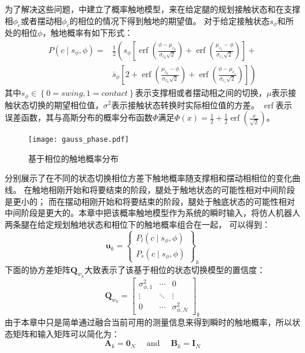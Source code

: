 为了解决这些问题，中建立了概率触地模型，来在给定腿的规划接触状态和在支撑相$\phi_c$或者摆动相$\phi_{\bar c}$的相位的情况下得到触地的期望值。
对于给定接触状态$s_{\phi}$和所处的相位$\phi$，触地概率有如下形式：
\begin{equation}
    \label{equ:est_contact_prob}
    \begin{aligned}
        P\left(c \mid s_\phi, \phi\right)= & \frac{1}{2}\left(s_\phi\left[\operatorname{erf}\left(\frac{\phi-\mu_{c_0}}{\sigma_{c_0} \sqrt{2}}\right)+\operatorname{erf}\left(\frac{\mu_{c_1}-\phi}{\sigma_{c_1} \sqrt{2}}\right)\right]+\right. \\
        & \left.\bar{s}_\phi\left[2+\operatorname{erf}\left(\frac{\mu_{\bar{c}_0}-\phi}{\sigma_{\bar{c}_0} \sqrt{2}}\right)+\operatorname{erf}\left(\frac{\phi-\mu_{\bar{c}_1}}{\sigma_{\bar{c}_1} \sqrt{2}}\right)\right]\right)
        \end{aligned}
\end{equation}
其中$s_{\phi} \in \left\{0=swing, 1=contact\right\}$表示支撑相或者摆动相之间的切换，$\mu$表示接触状态切换的期望相位值，$\sigma^2$表示接触状态转换时实际相位值的方差。
$\operatorname{erf}$表示误差函数，其与高斯分布的概率分布函数$\Phi$满足$\Phi(x)=\frac{1}{2}+\frac{1}{2} \operatorname{erf}\left(\frac{x}{\sqrt{2}}\right)$。
\begin{figure}[htbp]
    \centering
    \texttt{[image: gauss\_phase.pdf]}
    \caption{\label{fig:gauss_phase}基于相位的触地概率分布}
\end{figure}

分别展示了在不同的状态切换相位方差下触地概率随支撑相和摆动相相位的变化曲线。
在触地相刚开始和将要结束的阶段，腿处于触地状态的可能性相对中间阶段是更小的；
而在摆动相刚开始和将要结束的阶段，腿处于触底状态的可能性相对中间阶段是更大的。本章中把该概率触地模型作为系统的瞬时输入，将仿人机器人两条腿在给定规划触地状态和相位下的触地概率组合在一起，
可以得到：
\begin{equation}
    \label{equ:est_input}
    \boldsymbol{u}_k=\left\{\begin{array}{c}
        P_l\left(c \mid s_\phi, \phi\right) \\
        P_r\left(c \mid s_\phi, \phi\right)
        \end{array}\right\}_k
\end{equation}
下面的协方差矩阵$\boldsymbol{Q}_{w_k}$大致表示了该基于相位的状态切换模型的置信度：
\begin{equation}
    \label{equ:est_process_noise}
    \boldsymbol{Q}_{w_k}=\left[\begin{array}{ccc}
        \sigma_{\phi, 1}^2 & \cdots & 0 \\
        \vdots & \ddots & \vdots \\
        0 & \cdots & \sigma_{\phi, N}^2
        \end{array}\right]_k
\end{equation}
由于本章中只是简单通过融合当前可用的测量信息来得到瞬时的触地概率，所以状态矩阵和输入矩阵可以简化为：
\begin{equation}
    \label{equ:est_process_matrix}
    \boldsymbol{A}_k=\mathbf{0}_N \quad \text { and } \quad \boldsymbol{B}_k=\mathbf{I}_N
\end{equation}
